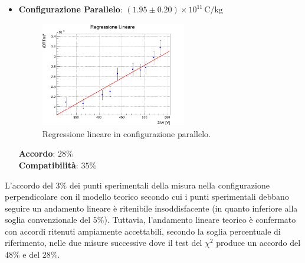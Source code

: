 \documentclass[a4paper,12pt]{article}
\begin{document}
\begin{itemize}
    \item \textbf{Configurazione Parallelo}: \( (1.95 \pm 0.20) \times 10^{11} \, \text{C/kg}\)
    \begin{figure}[H]
        \centering
        \includegraphics[width=0.6\textwidth]{regr_parallelo.png}
        \caption{Regressione lineare in configurazione parallelo.}
        \label{fig:regr_parallelo}
    \end{figure}
    \textbf{Accordo}: \(28\%\) \\
    \textbf{Compatibilità}: \(35\%\)
\end{itemize}
L’accordo del \(3\%\) dei punti sperimentali della misura nella configurazione perpendicolare con il modello teorico secondo cui i punti sperimentali debbano seguire un andamento lineare è ritenibile insoddisfacente (in quanto inferiore alla soglia convenzionale del \(5\%\)). Tuttavia, l’andamento lineare teorico è confermato con accordi ritenuti ampiamente accettabili, secondo la soglia percentuale di riferimento, nelle due misure successive dove il test del \( \chi^2 \) produce un accordo del \(48\%\) e del \(28\%\).

\end{document}
